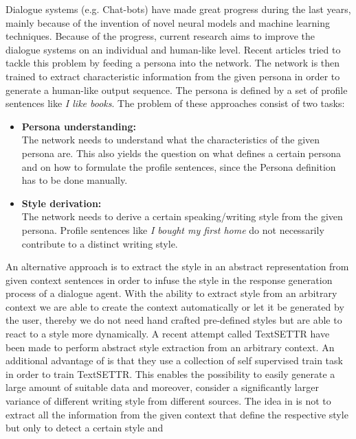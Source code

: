 \documentclass[twocolumn]{tum-article}
\begin{document}
Dialogue systems (e.g. Chat-bots) have made great progress during the last years, mainly because of the invention of novel neural models and machine learning techniques. Because of the progress, current research aims to improve the dialogue systems on an individual and human-like level. Recent articles \cite{DBLP:journals/corr/abs-1901-08149, liu2020impress} tried to tackle this problem by feeding a persona into the network. The network is then trained to extract characteristic information from the given persona in order to generate a human-like output sequence. The persona is defined by a set of profile sentences like \textit{I like books}. The problem of these approaches consist of two tasks:
\begin{itemize}
\item \textbf{Persona understanding:}\\
The network needs to understand what the characteristics of the given persona are. This also yields the question on what defines a certain persona and on how to formulate the profile sentences, since the Persona definition has to be done manually. 
\item \textbf{Style derivation:}\\
The network needs to derive a certain speaking/writing style from the given persona. Profile sentences like \textit{I bought my first home} \cite{liu2020impress} do not necessarily contribute to a distinct writing style.
\end{itemize}
An alternative approach is to extract the style in an abstract representation from given context sentences in order to infuse the style in the response generation process of a dialogue agent. With the ability to extract style from an arbitrary context we are able to create the context automatically or let it be generated by the user, thereby we do not need hand crafted pre-defined styles but are able to react to a style more dynamically. A recent attempt called TextSETTR \cite{riley2020textsettr} have been made to perform abstract style extraction from an arbitrary context. An additional advantage of \cite{riley2020textsettr} is that they use a collection of self supervised train task in order to train TextSETTR. This enables the possibility to easily generate a large amount of suitable data and moreover, consider a significantly larger variance of different writing style from different sources. 
The idea in \cite{riley2020textsettr} is not to extract all the information from the given context that define the respective style but only to detect a certain style and 
\end{document}
